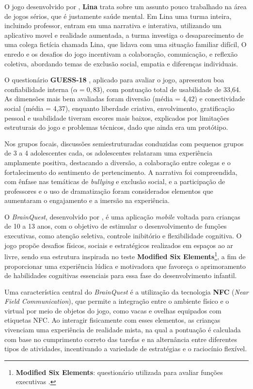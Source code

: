 O jogo desenvolvido por , \textbf{Lina} trata sobre um assunto pouco trabalhado na área de jogos sérios, que é justamente saúde mental. Em Lina uma turma inteira, incluindo professor, entram em uma narrativa e interativa, utilizando um aplicativo movel e realidade aumentada, a turma investiga o desaparecimento de uma colega fictícia chamada Lina, que lidava com uma situação familiar difícil, O enredo e os desafios do jogo incentivam a colaboração, comunicação, e reflexão coletiva, abordando temas de exclusão social, empatia e diferenças individuais.

O questionário \textbf{GUESS-18} \cite{Keebler2020}, aplicado para avaliar o jogo, apresentou boa confiabilidade interna ($\alpha = 0,83$), com pontuação total de usabilidade de 33,64. As dimensões mais bem avaliadas foram diversão (média = 4,42) e conectividade social (média = 4,37), enquanto liberdade criativa, envolvimento, gratificação pessoal e usabilidade tiveram escores mais baixos, explicados por limitações estruturais do jogo e problemas técnicos, dado que ainda era um protótipo.

Nos grupos focais, discussões semiestruturadas conduzidas com pequenos grupos de 3 a 4 adolescentes cada, os adolescentes relataram uma experiência amplamente positiva, destacando a diversão, a colaboração entre colegas e o fortalecimento do sentimento de pertencimento. A narrativa foi compreendida, com ênfase nas temáticas de \textit{bullying} e exclusão social, e a participação de professores e o uso de dramatização foram considerados elementos que aumentaram o engajamento e a imersão na experiência.

O \textit{BrainQuest}, desenvolvido por \cite{Gray2019}, é uma aplicação \textit{mobile} voltada para crianças de 10 a 13 anos, com o objetivo de estimular o desenvolvimento de funções executivas, como atenção seletiva, controle inibitório e flexibilidade cognitiva. O jogo propõe desafios físicos, sociais e estratégicos realizados em espaços ao ar livre, sendo sua estrutura inspirada no teste \textbf{Modified Six Elements}\footnote{\textbf{Modified Six Elements}:  questionário utilizada para avaliar funções executivas \cite{Venning2015}.}, a fim de proporcionar uma experiência lúdica e motivadora que favoreça o aprimoramento de habilidades cognitivas essenciais para essa fase do desenvolvimento infantil.

Uma característica central do \textit{BrainQuest} é a utilização da tecnologia \textbf{NFC} (\textit{Near Field Communication}), que permite a integração entre o ambiente físico e o virtual por meio de objetos do jogo, como vacas e ovelhas equipados com etiquetas NFC. Ao interagir fisicamente com esses elementos, as crianças vivenciam uma experiência de realidade mista, na qual a pontuação é calculada com base no cumprimento correto das tarefas e na alternância entre diferentes tipos de atividades, incentivando a variedade de estratégias e o raciocínio flexível.

